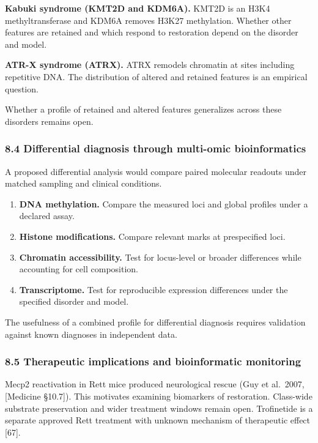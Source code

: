\documentclass[
]{article}
\begin{document}
\textbf{Kabuki syndrome (KMT2D and KDM6A).} KMT2D is an H3K4
methyltransferase and KDM6A removes H3K27 methylation. Whether other
features are retained and which respond to restoration depend on the
disorder and model.

\textbf{ATR-X syndrome (ATRX).} ATRX remodels chromatin at sites
including repetitive DNA. The distribution of altered and retained
features is an empirical question.

Whether a profile of retained and altered features generalizes across
these disorders remains open.

\hypertarget{differential-diagnosis-through-multi-omic-bioinformatics}{%
\subsubsection{8.4 Differential diagnosis through multi-omic
bioinformatics}\label{differential-diagnosis-through-multi-omic-bioinformatics}}

A proposed differential analysis would compare paired molecular readouts
under matched sampling and clinical conditions.

\begin{enumerate}
\def\labelenumi{\arabic{enumi}.}
\item
  \textbf{DNA methylation.} Compare the measured loci and global
  profiles under a declared assay.
\item
  \textbf{Histone modifications.} Compare relevant marks at prespecified
  loci.
\item
  \textbf{Chromatin accessibility.} Test for locus-level or broader
  differences while accounting for cell composition.
\item
  \textbf{Transcriptome.} Test for reproducible expression differences
  under the specified disorder and model.
\end{enumerate}

The usefulness of a combined profile for differential diagnosis requires
validation against known diagnoses in independent data.

\hypertarget{therapeutic-implications-and-bioinformatic-monitoring}{%
\subsubsection{8.5 Therapeutic implications and bioinformatic
monitoring}\label{therapeutic-implications-and-bioinformatic-monitoring}}

Mecp2 reactivation in Rett mice produced neurological rescue (Guy et
al.~2007, {[}Medicine §10.7{]}). This motivates examining biomarkers of
restoration. Class-wide substrate preservation and wider treatment
windows remain open. Trofinetide is a separate approved Rett treatment
with unknown mechanism of therapeutic effect {[}67{]}.
\end{document}
